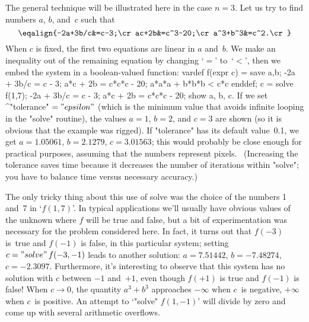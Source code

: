 The general technique will be illustrated here in the case $n=3$.
Let us try to find numbers $a$, $b$, and~$c$ such that
$$\eqalign{-2a+3b/c&=c-3;\cr
  ac+2b&=c^3-20;\cr
  a^3+b^3&=c^2.\cr}$$
When $c$ is fixed, the first two equations are linear in $a$ and~$b$.
We make an inequality out of the remaining equation by changing `$=$'
to~`$<$', then we embed the system in a boolean-valued function:
\begintt
vardef f(expr c) = save a,b;
 -2a + 3b/c = c - 3;
 a*c + 2b = c*c*c - 20;
 a*a*a + b*b*b < c*c enddef;
c = solve f(1,7);
-2a + 3b/c = c - 3;
a*c + 2b = c*c*c - 20;
show a, b, c.
\endtt
If we set ^"tolerance"$\null="epsilon"$ (which is the minimum value
that avoids infinite looping in the "solve" routine), the values
$a=1$, $b=2$, and $c=3$ are shown (so it is obvious that the example
was rigged). If "tolerance" has its default value~0.1, we get
$a=1.05061$, $b=2.1279$, $c=3.01563$; this would probably be close
enough for practical purposes, assuming that the numbers represent
pixels. \ (Increasing the tolerance saves time because it
decreases the number of iterations within "solve"; you have to
balance time versus necessary accuracy.)

The only tricky thing about this use of solve was the choice of the
numbers 1 and~7 in `$f(1,7)$'. In typical applications we'll usually have
obvious values of the unknown where $f$ will be true and false,
but a bit of experimentation was necessary for the problem considered
here. In fact,
it turns out that $f(-3)$ is~true and $f(-1)$ is false, in this
particular system; setting $c="solve"\,f(-3,-1)$ leads to
another solution: $a=7.51442$, $b=-7.48274$, $c=-2.3097$. Furthermore,
it's interesting to observe that this system has no solution with
$c$ between $-1$ and~$+1$, even though $f(+1)$ is true and
$f(-1)$ is false! When $c\rightarrow0$, the quantity $a^3+b^3$
approaches $-\infty$ when $c$~is negative, $+\infty$ when $c$~is
positive. An attempt to `"solve" $f(1,-1)$' will divide by zero and
come up with several arithmetic overflows.

